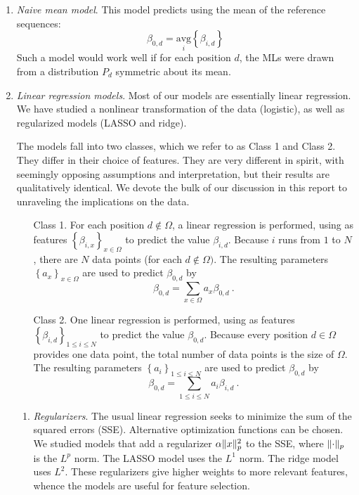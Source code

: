 \documentclass{article} %
\DeclarePairedDelimiter{\norm}{\lVert}{\rVert}
\begin{document}
\begin{enumerate}

\item \emph{Naive mean model}. This model predicts using the mean of the reference sequences:
\[ \beta_{0,d} = \underset{i}{\text{avg}} \left\{ \beta_{i,d}\right\}\]
Such a model would work well if for each position $d$, the MLs were drawn from a distribution $P_d$ symmetric about its mean.
\item \emph{Linear regression models}. Most of our models are essentially linear regression. We have studied a nonlinear transformation of the data (logistic), as well as regularized models (LASSO and ridge).

The models fall into two classes, which we refer to as Class 1 and Class 2. They differ in their choice of features. They are very different in spirit, with seemingly opposing assumptions and interpretation, but their results are qualitatively identical. We devote the bulk of our discussion in this report to unraveling the implications on the data.

\begin{itemize}
\item [Class 1.] For each position $d \notin \Omega$, a linear regression is performed, using as features $\left\{ \beta_{i,x} \right\}_{x \in \Omega}$ to predict the value $\beta_{i,d}$. Because $i$ runs from $1$ to $N$, there are $N$ data points (for each $d \notin \Omega)$. The resulting parameters $\left\{ a_x\right\}_{x \in \Omega}$ are used to predict $\beta_{0,d}$ by
\begin{equation} \label{beta.sites}\beta_{0,d} = \sum_{x \in \Omega} a_x \beta_{0,d} \ .\end{equation}
\item [Class 2.] One linear regression is performed, using as features $\left\{ \beta_{i,d} \right\}_{1\leq i \leq N}$ to predict the value $\beta_{0,d}$. Because every position $d \in \Omega$ provides one data point, the total number of data points is the size of $\Omega$. The resulting parameters $\left\{ a_{i}\right\}_{1\leq i \leq N}$ are used to predict $\beta_{0,d}$ by
\begin{equation} \label{beta.samples} \beta_{0,d} = \sum_{1 \leq i \leq N} a_i \beta_{i,d} \ .\end{equation}
\end{itemize}

\begin{enumerate}
\item \emph{Regularizers}. The usual linear regression seeks to minimize the sum of the squared errors (SSE). Alternative optimization functions can be chosen. We studied models that add a regularizer $\alpha \norm{x}_p^2$ to the SSE, where $\norm{\cdot}_p$ is the $L^p$ norm. The LASSO model uses the $L^1$ norm. The ridge model uses $L^2$. These regularizers give higher weights to more relevant features, whence the models are useful for feature selection.
\end{enumerate}


\end{enumerate}
\end{document}
